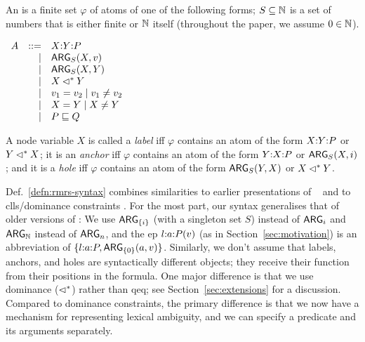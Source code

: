 \begin{definition}\label{defn:rmrs-syntax}
  An \emph{\rmrs} is a finite set $\varphi$ of atoms of one of the
  following forms; $S \subseteq \mathbb{N}$ is a set of numbers that is either
  finite or $\mathbb{N}$ itself (throughout the paper, we assume 
    $0 \in \mathbb{N}$).

$\begin{array}{rrll}
A &::= &\ep{X}{Y}{P} \\ %
&| &\ARG_S(X,v) \\ %
&| &\ARG_S(X,Y) \\ %
&| &X \dom Y \\ %
&| &v_1 = v_2 \;|\; v_1 \neq v_2 \\ %
&| &X = Y \;|\; X \neq Y \\ %
&| &P \spec Q %
\end{array}
$

A node variable $X$ is called a \emph{label} iff $\varphi$ contains an
atom of the form $X {:} Y {:} P$ or $Y \lhd^* X$; it is an 
\emph{anchor} iff $\varphi$ contains an atom
of the form $Y {:} X {:} P$ or $\mathsf{ARG}_S(X,i)$; and it is a
\emph{hole} iff $\varphi$ contains an atom of the form $\mathsf{ARG}_S(Y,X)$
or $X \lhd^* Y$.
\end{definition}

Def.~\ref{defn:rmrs-syntax} combines similarities to earlier
presentations of \rmrs\ \cite{copestake:2003,copestake:2007b} and to
{\sc clls}/dominance constraints \cite{egg:etal:2001}.  For the most
part, our syntax generalises that of older versions of \rmrs: We use
$\mathsf{ARG}_{\{i\}}$ (with a singleton set $S$) instead of $\mathsf{ARG}_i$ and
$\mathsf{ARG}_{\mathbb{N}}$ instead of $\mathsf{ARG}_n$, and the {\sc ep} $l {:} a {:} P(v)$ (as
in Section~\ref{sec:motivation}) is an abbreviation of
$\{l {:} a {:} P, \mathsf{ARG}_{\{0\}}(a,v)\}$.  Similarly, we don't assume
that labels, anchors, and holes are syntactically different objects;
they receive their function from their positions in the formula.  One
major difference is that we use dominance ($\lhd^*$) rather than qeq; see
Section~\ref{sec:extensions} for a discussion.  Compared to dominance
constraints, the primary difference is that we now have a mechanism
for representing lexical ambiguity, and we can specify a predicate and
its arguments separately.


